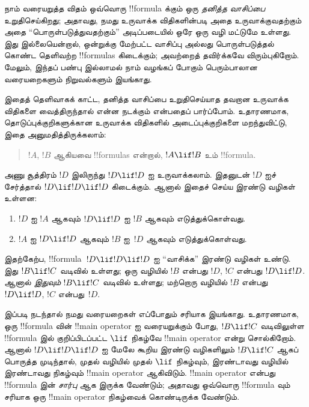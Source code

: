 \documentclass[../../../include/open-logic-section]{subfiles}
\begin{document}


\begin{explain}
நாம் வரையறுத்த விதம் ஒவ்வொரு !!{formula} க்கும் ஒரு \emph{தனித்த வாசிப்பை}
உறுதிசெய்கிறது; அதாவது, நமது உருவாக்க விதிகளின்படி அதை உருவாக்குவதற்கும்
அதை ``பொருள்படுத்துவதற்கும்'' அடிப்படையில் ஒரே ஒரு வழி மட்டுமே உள்ளது.
இது இல்லையென்றால், ஒன்றுக்கு மேற்பட்ட வாசிப்பு அல்லது பொருள்படுத்தல் கொண்ட
தெளிவற்ற !!{formula}s கிடைக்கும்; அவற்றைத் தவிர்க்கவே விரும்புகிறோம்.
மேலும், இந்தப் பண்பு இல்லாமல் நாம் வழங்கப் போகும் பெரும்பாலான வரையறைகளும்
நிறுவல்களும் இயங்காது.

இதைத் தெளிவாகக் காட்ட, தனித்த வாசிப்பை உறுதிசெய்யாத தவறான உருவாக்க
விதிகளை வைத்திருந்தால் என்ன நடக்கும் என்பதைப் பார்ப்போம். உதாரணமாக,
தொடுப்புக்குறிகளுக்கான உருவாக்க விதிகளில் அடைப்புக்குறிகளை மறந்துவிட்டு,
இதை அனுமதித்திருக்கலாம்:
\begin{quote}
$!A$, $!B$ ஆகியவை !!{formula}s என்றால், $!A \lif !B$ உம் !!{formula}.
\end{quote}
அணு சூத்திரம் $!D$ இலிருந்து $!D \lif !D$ ஐ உருவாக்கலாம். இதனுடன்
$!D$ ஐச் சேர்த்தால் $!D \lif !D \lif !D$ கிடைக்கும். ஆனால் இதைச் செய்ய
இரண்டு வழிகள் உள்ளன:
\begin{enumerate}
\item $!D$ ஐ $!A$ ஆகவும் $!D \lif !D$ ஐ $!B$ ஆகவும் எடுத்துக்கொள்வது.
\item $!A$ ஐ $!D \lif !D$ ஆகவும் $!B$ ஐ~$!D$ ஆகவும் எடுத்துக்கொள்வது.
\end{enumerate}
இதற்கேற்ப, !!{formula}~$!D \lif !D \lif !D$ ஐ ``வாசிக்க'' இரண்டு
வழிகள் உண்டு. இது $!B \lif !C$ வடிவில் உள்ளது; ஒரு வழியில் $!B$ என்பது
$!D$, $!C$ என்பது $!D \lif !D$. ஆனால் \emph{இதுவும்} $!B \lif !C$
வடிவில் உள்ளது; மற்றொரு வழியில் $!B$ என்பது $!D \lif !D$, $!C$ என்பது~$!D$.

இப்படி நடந்தால் நமது வரையறைகள் எப்போதும் சரியாக இயங்காது. உதாரணமாக,
ஒரு !!{formula} வின் !!{main operator} ஐ வரையறுக்கும் போது,
$!B \lif !C$ வடிவிலுள்ள !!{formula} இல் குறிப்பிடப்பட்ட $\lif$ நிகழ்வே
!!{main operator} என்று சொல்கிறோம். ஆனால் $!D \lif !D \lif !D$ ஐ மேலே
கூறிய இரண்டு வழிகளிலும் $!B \lif !C$ ஆகப் பொருத்த முடிந்தால், முதல்
வழியில் முதல் $\lif$ நிகழ்வும், இரண்டாவது வழியில் இரண்டாவது நிகழ்வும்
!!{main operator} ஆகிவிடும். !!{main operator} என்பது !!{formula} இன்
\emph{சார்பு} ஆக இருக்க வேண்டும்; அதாவது ஒவ்வொரு !!{formula} வும்
சரியாக ஒரு !!{main operator} நிகழ்வைக் கொண்டிருக்க வேண்டும்.
\end{explain}
\end{document}
